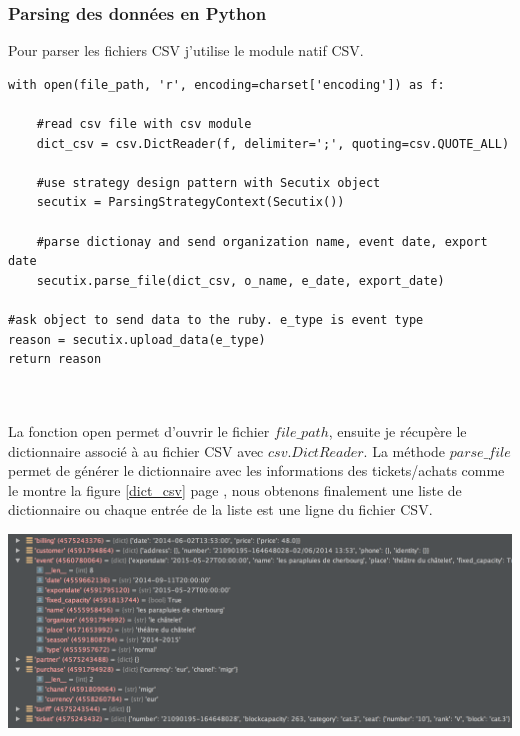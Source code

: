 \subsubsection{Parsing des données en Python}
Pour parser les fichiers CSV j'utilise le module natif CSV.
\\


\lstset{style=custompython}
\begin{lstlisting}
with open(file_path, 'r', encoding=charset['encoding']) as f:

	#read csv file with csv module
	dict_csv = csv.DictReader(f, delimiter=';', quoting=csv.QUOTE_ALL)
	
	#use strategy design pattern with Secutix object
	secutix = ParsingStrategyContext(Secutix())	
	
	#parse dictionay and send organization name, event date, export date
	secutix.parse_file(dict_csv, o_name, e_date, export_date)

#ask object to send data to the ruby. e_type is event type 
reason = secutix.upload_data(e_type)
return reason
\end{lstlisting}


\leavevmode \\\\ 
La fonction open permet d'ouvrir le fichier $file\_path$, ensuite je récupère le dictionnaire associé à au fichier CSV avec $csv.DictReader$. La méthode $parse\_file$ permet de générer le dictionnaire avec les informations des tickets/achats comme le montre la figure \ref{dict_csv} page \pageref{dict_csv}, nous obtenons finalement une liste de dictionnaire ou chaque entrée de la liste est une ligne du fichier CSV. 

\begin{center}
\includegraphics[scale=0.45]{Images/dict_tickets.png}
\label{dict_csv}
\end{center}


